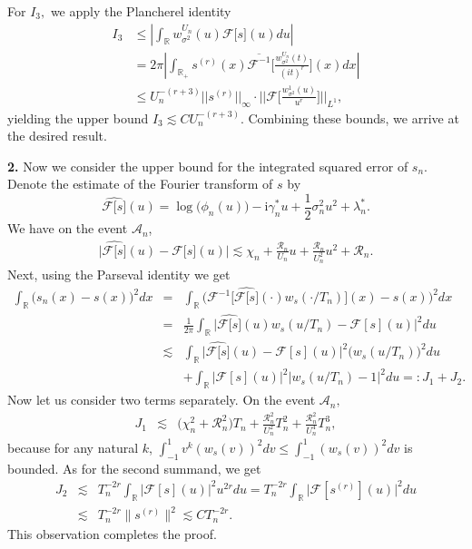 \documentclass[a4paper,11pt]{article}
\theoremstyle{definition}
\newcommand{\R}{{\mathbb{R}}}
\newcommand{\1}{\mathbb{I}}
\newcommand{\A}{\mathscr{A}}
\renewcommand{\A}{\mathcal{A}}
\renewcommand{\i}{\mathrm{i}}
\def\R{\mathbb{R}}
\newcommand{\F}{\mathcal{F}}
\theoremstyle{remark}
\begin{document}
For $I_3,$ we apply the Plancherel identity 
\begin{align*}
    I_3 &\leq |\int_{\R}w^{U_n}_{\sigma^2}(u)\F \bigl[s \bigr](u)du| \\
    &= 2\pi |\int_{\R_+} s^{(r)}(x)\overline{\F^{-1}} \bigl[ \frac{w^{U_n}_{\sigma^2}(t)}{(it)^r}\bigr](x)dx|  \\
    &\leq U_n^{-(r + 3)}||s^{(r)}||_{\infty} \cdot ||\F \bigl[ \frac{w^{1}_{\sigma^2}(u)}{u^r}\bigr]||_{L^1},
\end{align*}
yielding the upper bound \(I_3 \lesssim C  U_n^{-(r + 3)}\). Combining these bounds, we arrive at the desired result.\newline

\textbf{2.} Now we consider the upper bound for the integrated squared error of \(s_n.\) Denote the estimate of the Fourier transform of \(s\) by \[\widehat{\F\bigl[s \bigr]}(u)=
\log\bigl(
\phi_n(u) 
\bigr) - \i \gamma_n^* u + \frac{1}{2} \sigma_n^2 u^2+\lambda^*_n.\]
We have on the event \(\A_n\),
\begin{eqnarray*}
\bigl|
\widehat{\F\bigl[s \bigr]}(u)  - 
\F\bigl[s \bigr](u)
\bigr| 
\lesssim \chi_n + \frac{\mathcal{R}_n}{U_n} u +  \frac{\mathcal{R}_n}{U_n^2} u^2 +\mathcal{R}_n.
\end{eqnarray*}
Next, using the Parseval identity we get 
\begin{eqnarray*} 
\int_{\R} \bigl( 
s_n(x) - s(x) 
\bigr)^2 dx &=& 
\int_{\R} \bigl( 
\F^{-1}\bigl[\widehat{\F\bigl[s \bigr]}(\cdot)w_s(\cdot / T_n)\bigr](x) - s(x) 
\bigr)^2 dx \\ 
&=&
\frac{1}{2\pi}
\int_{\R} \bigl|
\widehat{\F\bigl[s \bigr]}(u)w_s(u / T_n) - \F[s](u) 
\bigr|^2 du \\
&\lesssim& 
\int_{\R} \bigl|
\widehat{\F\bigl[s \bigr]}(u) - \F[s](u) 
\bigr|^2 \bigl( w_s(u / T_n) \bigr)^2du 
\\
&& + \int_{\R} \bigl|
\F[s](u) 
\bigr|^2 \bigl| w_s(u / T_n) -1 \bigr|^2du 
=: J_1 +J_2.
\end{eqnarray*} 
Now let us consider two terms separately.  On the event \(\A_n,\)
\begin{eqnarray*}
J_1 &\lesssim& \bigl(\chi_n^2 + \mathcal{R}_n^2 \bigr) T_n +  \frac{\mathcal{R}_n^2}{U_n^2} T_n^2 + \frac{\mathcal{R}_n^2}{U_n^4} T_n^3,
\end{eqnarray*}
because for any natural \(k\), \(\int_{-1}^{1} v^k (w_s(v))^2 dv \leq \int_{-1}^{1} (w_s(v))^2 dv\) is bounded. As for the second summand, we get 
\begin{eqnarray*}
J_2 &\lesssim&  T_n^{-2r} \int_{\R} \bigl|
\F[s](u) 
\bigr|^2 u^{2r} du =
T_n^{-2r} \int_{\R} \bigl|
\F[s^{(r)}](u) 
\bigr|^2 du \\
&\lesssim& T_n^{-2r} \|
s^{(r)}
\|^2 \lesssim C T_n^{-2r}.
\end{eqnarray*}
This observation completes the proof.
\end{document}
